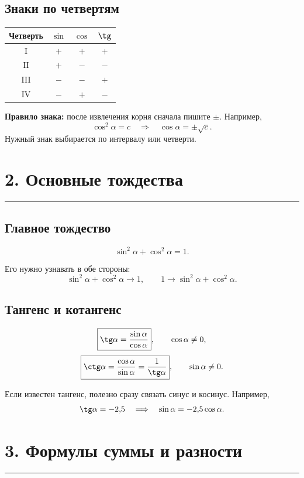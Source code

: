 \documentclass[a4paper,12pt]{article}
\newcommand{\sectionline}{\vspace{-1mm}\noindent\color{accent}\rule{\linewidth}{0.7pt}\color{textgray}\vspace{2mm}}
\newcommand{\key}[1]{\textbf{\color{darkaccent}#1}}
\begin{document}
\subsection*{Знаки по четвертям}

\begin{center}
\begin{tabular}{c|c|c|c}
\toprule
\textbf{Четверть} & $\sin$ & $\cos$ & $\tg$\\
\midrule
I   & $+$ & $+$ & $+$\\
II  & $+$ & $-$ & $-$\\
III & $-$ & $-$ & $+$\\
IV  & $-$ & $+$ & $-$\\
\bottomrule
\end{tabular}
\end{center}

\key{Правило знака:} после извлечения корня сначала пишите $\pm$. Например,
\[
\cos^2\alpha=c\quad\Longrightarrow\quad \cos\alpha=\pm\sqrt c.
\]
Нужный знак выбирается по интервалу или четверти.

\section*{2. Основные тождества}
\sectionline

\subsection*{Главное тождество}
\[
\boxed{\sin^2\alpha+\cos^2\alpha=1}.
\]

Его нужно узнавать в обе стороны:
\[
\sin^2\alpha+\cos^2\alpha\longrightarrow1,
\qquad
1\longrightarrow\sin^2\alpha+\cos^2\alpha.
\]

\subsection*{Тангенс и котангенс}
\[
\boxed{\tg\alpha=\frac{\sin\alpha}{\cos\alpha}},\qquad \cos\alpha\ne0,
\]
\[
\boxed{\ctg\alpha=\frac{\cos\alpha}{\sin\alpha}=\frac1{\tg\alpha}},
\qquad \sin\alpha\ne0.
\]

Если известен тангенс, полезно сразу связать синус и косинус. Например,
\[
\tg\alpha=-2{,}5
\quad\Longrightarrow\quad
\sin\alpha=-2{,}5\cos\alpha.
\]

\section*{3. Формулы суммы и разности}
\sectionline
\end{document}
